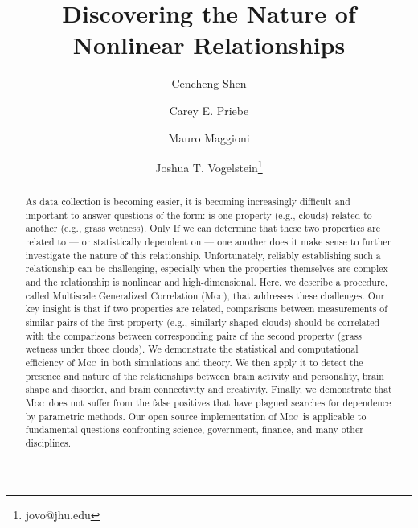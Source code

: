 \documentclass[11pt]{article}
\newcommand{\note}[2][]{\added[#1,remark={#2}]{}}
\providecommand{\sct}[1]{{\normalfont\textsc{#1}}}
\newcommand{\Mgc}{\sct{Mgc}}
\newcommand{\cs}[1]{{\note{cs: #1}}}
\begin{document}
\def\spacingset#1{\renewcommand{\baselinestretch}%
{#1}\small\normalsize} \spacingset{1}

\title{\bf Discovering the Nature of Nonlinear Relationships}
\author[1,2]{Cencheng Shen} %
\author[1,3]{Carey E. Priebe}%
\author[3,4,6]{Mauro Maggioni}%
\author[1,5,6,7]{Joshua T. Vogelstein\thanks{jovo@jhu.edu}}
\maketitle

\begin{abstract}
As data collection is becoming easier, it is becoming increasingly difficult and important to answer questions of the form:
is one property (e.g., clouds) related to another (e.g., grass wetness).  Only If we can determine that these two properties are related to --- or statistically dependent on --- one another does it make sense to further investigate the nature of this relationship. Unfortunately, reliably establishing such a relationship can be  challenging, especially when the properties themselves are complex and the relationship is nonlinear and high-dimensional. Here, we describe a procedure, called Multiscale Generalized Correlation (\Mgc), that addresses these challenges. Our key insight is that if two properties are related, comparisons between measurements of similar pairs of the first property (e.g., similarly shaped clouds) should be correlated with the comparisons between corresponding pairs of the second property (grass wetness under those clouds). We demonstrate the statistical and computational efficiency of \Mgc~in both simulations and theory.  We then apply it to detect the presence and nature of the relationships between brain activity and personality, brain shape and disorder, and  brain connectivity and creativity.  Finally, we demonstrate that \Mgc~does not suffer from the false positives that have plagued searches for dependence by parametric methods. 
Our open source implementation of \Mgc~is applicable to fundamental questions confronting science, government, finance, and many other disciplines. 
\end{abstract}
\cs{title good?}
\end{document}
